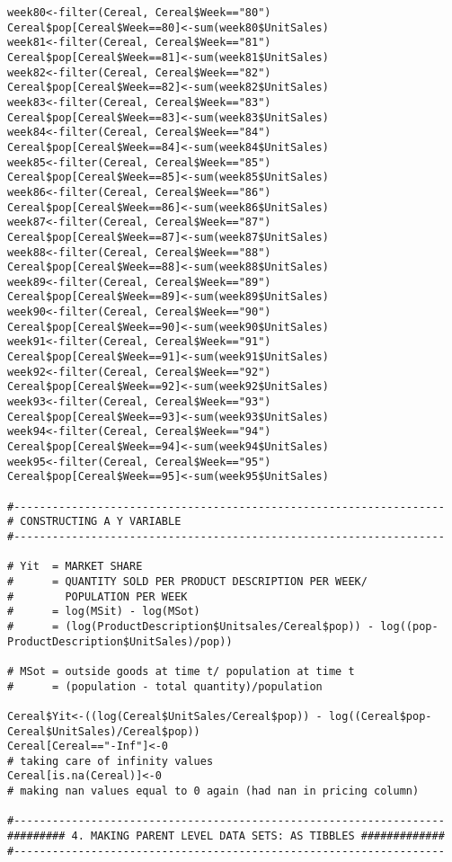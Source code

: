 \documentclass[12pt,english]{article}
\begin{document}
\begin{lstlisting}
week80<-filter(Cereal, Cereal$Week=="80")
Cereal$pop[Cereal$Week==80]<-sum(week80$UnitSales)
week81<-filter(Cereal, Cereal$Week=="81")
Cereal$pop[Cereal$Week==81]<-sum(week81$UnitSales)
week82<-filter(Cereal, Cereal$Week=="82")
Cereal$pop[Cereal$Week==82]<-sum(week82$UnitSales)
week83<-filter(Cereal, Cereal$Week=="83")
Cereal$pop[Cereal$Week==83]<-sum(week83$UnitSales)
week84<-filter(Cereal, Cereal$Week=="84")
Cereal$pop[Cereal$Week==84]<-sum(week84$UnitSales)
week85<-filter(Cereal, Cereal$Week=="85")
Cereal$pop[Cereal$Week==85]<-sum(week85$UnitSales)
week86<-filter(Cereal, Cereal$Week=="86")
Cereal$pop[Cereal$Week==86]<-sum(week86$UnitSales)
week87<-filter(Cereal, Cereal$Week=="87")
Cereal$pop[Cereal$Week==87]<-sum(week87$UnitSales)
week88<-filter(Cereal, Cereal$Week=="88")
Cereal$pop[Cereal$Week==88]<-sum(week88$UnitSales)
week89<-filter(Cereal, Cereal$Week=="89")
Cereal$pop[Cereal$Week==89]<-sum(week89$UnitSales)
week90<-filter(Cereal, Cereal$Week=="90")
Cereal$pop[Cereal$Week==90]<-sum(week90$UnitSales)
week91<-filter(Cereal, Cereal$Week=="91")
Cereal$pop[Cereal$Week==91]<-sum(week91$UnitSales)
week92<-filter(Cereal, Cereal$Week=="92")
Cereal$pop[Cereal$Week==92]<-sum(week92$UnitSales)
week93<-filter(Cereal, Cereal$Week=="93")
Cereal$pop[Cereal$Week==93]<-sum(week93$UnitSales)
week94<-filter(Cereal, Cereal$Week=="94")
Cereal$pop[Cereal$Week==94]<-sum(week94$UnitSales)
week95<-filter(Cereal, Cereal$Week=="95")
Cereal$pop[Cereal$Week==95]<-sum(week95$UnitSales)

#-------------------------------------------------------------------
# CONSTRUCTING A Y VARIABLE
#-------------------------------------------------------------------

# Yit  = MARKET SHARE
#      = QUANTITY SOLD PER PRODUCT DESCRIPTION PER WEEK/ 
#        POPULATION PER WEEK
#      = log(MSit) - log(MSot)
#      = (log(ProductDescription$Unitsales/Cereal$pop)) - log((pop-ProductDescription$UnitSales)/pop))

# MSot = outside goods at time t/ population at time t
#      = (population - total quantity)/population

Cereal$Yit<-((log(Cereal$UnitSales/Cereal$pop)) - log((Cereal$pop-Cereal$UnitSales)/Cereal$pop))
Cereal[Cereal=="-Inf"]<-0
# taking care of infinity values
Cereal[is.na(Cereal)]<-0
# making nan values equal to 0 again (had nan in pricing column)

#-------------------------------------------------------------------
######### 4. MAKING PARENT LEVEL DATA SETS: AS TIBBLES #############
#-------------------------------------------------------------------


\end{lstlisting}
\end{document}
